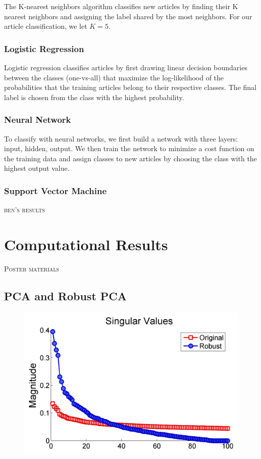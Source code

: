 \documentclass[12pt]{article}
\newcommand{\comment}[1]{\textsc{\color[rgb]{1,0,0}#1}}
\begin{document}
The K-nearest neighbors algorithm classifies new articles by
finding their K nearest neighbors and assigning the label shared by the most neighbors. For our article classification, we let $K = 5$.

\subsubsection{Logistic Regression}

Logistic regression classifies articles by first drawing linear decision
boundaries between the classes (one-vs-all) that maximize the log-likelihood of the probabilities that the training articles belong to their respective classes. The final label is chosen from the class with the highest probability.

\subsubsection{Neural Network}

To classify with neural networks, we first build a network with three
layers: input, hidden, output. We then train the network to minimize a cost function on the training data and assign classes to new articles by choosing the class with the highest output value.

\subsubsection{Support Vector Machine}

\comment{ben's results}

\section{Computational Results}
\comment{Poster materials}

\subsection{PCA and Robust PCA}
\begin{figure}[H]
\centering
\includegraphics[width=.6\textwidth]{figures/singularvaluescompare}
\end{figure}
\end{document}
